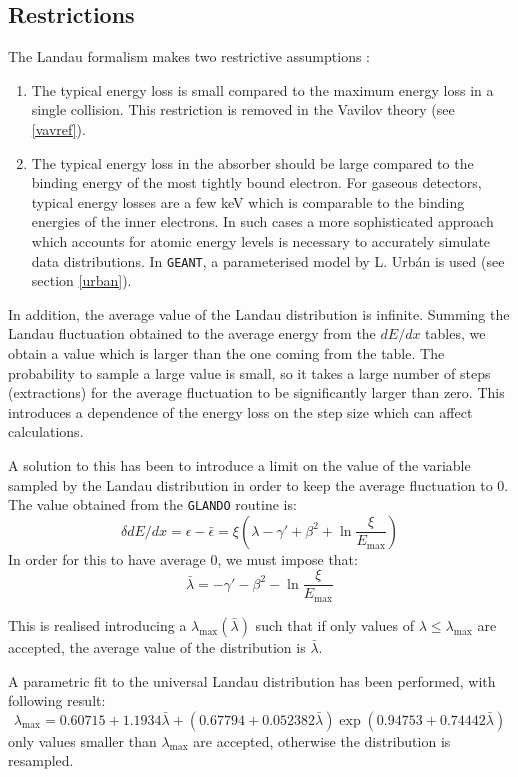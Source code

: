 \documentclass{article}
\newcommand{\Emax}{\ensuremath{E_{\mathrm{max}}}}
\newcommand{\GEANT}{\texttt{GEANT}}
\begin{document}
\subsection{Restrictions}

The Landau formalism makes two restrictive assumptions :
\begin{enumerate}
\item The typical energy loss is small compared to the maximum energy
  loss in a single collision.  This restriction is removed in the
  Vavilov theory (see \autoref{vavref}).
\item The typical energy loss in the absorber should be large compared
  to the binding energy of the most tightly bound electron.  For
  gaseous detectors, typical energy losses are a few keV which is
  comparable to the binding energies of the inner electrons.  In such
  cases a more sophisticated approach which accounts for atomic energy
  levels\cite{bib-TALM} is necessary to accurately simulate data
  distributions. In \GEANT, a parameterised model by L.  Urb\'{a}n is
  used (see section \ref{urban}).
\end{enumerate}

In addition, the average value of the Landau distribution is infinite.
Summing the Landau fluctuation obtained to the average energy from the
$dE/dx$ tables, we obtain a value which is larger than the one coming
from the table.  The probability to sample a large value is small, so
it takes a large number of steps (extractions) for the average
fluctuation to be significantly larger than zero. This introduces a
dependence of the energy loss on the step size which can affect
calculations.

A solution to this has been to introduce a limit on the value of the
variable sampled by the Landau distribution in order to keep the
average fluctuation to 0. The value obtained from the \texttt{GLANDO}
routine is:
\[
\delta dE/dx = \epsilon - \bar{\epsilon} = \xi ( \lambda - \gamma'
+\beta^2 +\ln \frac{\xi}{\Emax})
\]
In order for this to have average 0, we must impose that:
\[
\bar{\lambda} = -\gamma' - \beta^2 -\ln \frac{\xi}{\Emax}
\]

This is realised introducing a $\lambda_{\mathrm{max}}(\bar{\lambda})$
such that if only values of $\lambda \leq \lambda_{\mathrm{max}}$ are
accepted, the average value of the distribution is $\bar{\lambda}$.

A parametric fit to the universal Landau distribution has been
performed, with following result:
\[
\lambda_{\mathrm{max}} = 0.60715 +
     1.1934\bar{\lambda}+(0.67794+0.052382\bar{\lambda})
     \exp(0.94753+0.74442\bar{\lambda})
\]
only values smaller than $\lambda_{\mathrm{max}}$ are accepted, otherwise the
distribution is resampled.
\end{document}
